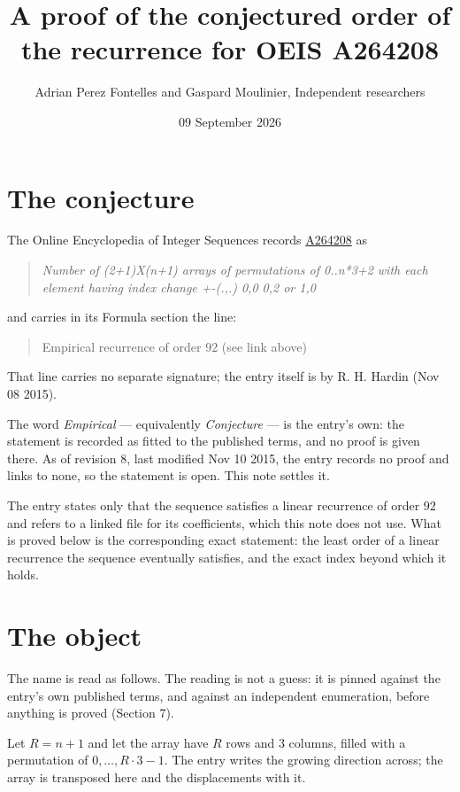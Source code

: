 \documentclass[11pt]{article}
\title{A proof of the conjectured order of the recurrence for OEIS A264208}
\author{Adrian Perez Fontelles and Gaspard Moulinier, Independent researchers}
\date{09 September 2026}
\theoremstyle{definition}
\begin{document}
\maketitle
\section{The conjecture}

The Online Encyclopedia of Integer Sequences records \href{https://oeis.org/A264208}{A264208} as

\begin{quote}\itshape Number of (2+1)X(n+1) arrays of permutations of 0..n*3+2 with each element having index change +-(.,.) 0,0 0,2 or 1,0\end{quote}

and carries in its Formula section the line:

\begin{quote}\ttfamily Empirical recurrence of order 92 (see link above)\end{quote}

That line carries no separate signature; the entry itself is by R. H. Hardin (Nov 08 2015).

The word {\itshape Empirical} --- equivalently {\itshape Conjecture} --- is the entry's own: the statement is recorded as fitted to the published terms, and no proof is given there. As of revision 8, last modified Nov 10 2015, the entry records no proof and links to none, so the statement is open. This note settles it.

The entry states only that the sequence satisfies a linear recurrence of order $92$ and refers to a linked file for its coefficients, which this note does not use. What is proved below is the corresponding exact statement: the least order of a linear recurrence the sequence eventually satisfies, and the exact index beyond which it holds.

\section{The object}

The name is read as follows. The reading is not a guess: it is pinned against the entry's own published terms, and against an independent enumeration, before anything is proved (Section 7).

Let $R = n + 1$ and let the array have $R$ rows and $3$ columns, filled with a permutation of $0,\dots,R\cdot3-1$. The entry writes the growing direction across; the array is transposed here and the displacements with it.
\end{document}
